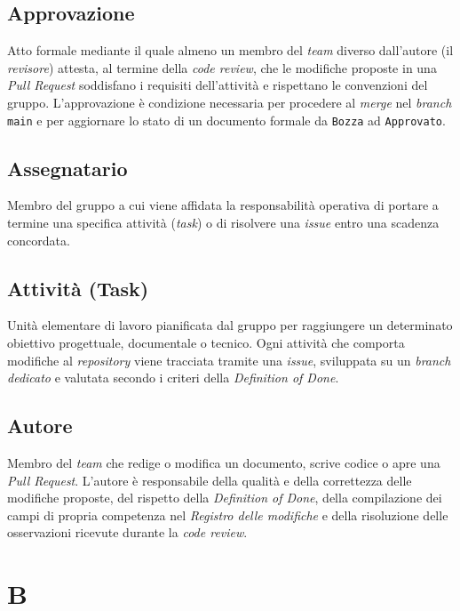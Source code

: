 \documentclass[11pt, a4paper]{article}
\begin{document}
\subsection*{Approvazione}
Atto formale mediante il quale almeno un membro del \textit{team} diverso dall'autore (il \textit{revisore}) attesta, al termine della \textit{code review}, che le modifiche proposte in una \textit{Pull Request} soddisfano i requisiti dell'attività e rispettano le convenzioni del gruppo. L'approvazione è condizione necessaria per procedere al \textit{merge} nel \textit{branch} \texttt{main} e per aggiornare lo stato di un documento formale da \texttt{Bozza} ad \texttt{Approvato}.

\subsection*{Assegnatario}
Membro del gruppo a cui viene affidata la responsabilità operativa di portare a termine una specifica attività (\textit{task}) o di risolvere una \textit{issue} entro una scadenza concordata.

\subsection*{Attività (Task)}
Unità elementare di lavoro pianificata dal gruppo per raggiungere un determinato obiettivo progettuale, documentale o tecnico. Ogni attività che comporta modifiche al \textit{repository} viene tracciata tramite una \textit{issue}, sviluppata su un \textit{branch dedicato} e valutata secondo i criteri della \textit{Definition of Done}.

\subsection*{Autore}
Membro del \textit{team} che redige o modifica un documento, scrive codice o apre una \textit{Pull Request}. L'autore è responsabile della qualità e della correttezza delle modifiche proposte, del rispetto della \textit{Definition of Done}, della compilazione dei campi di propria competenza nel \textit{Registro delle modifiche} e della risoluzione delle osservazioni ricevute durante la \textit{code review}.

\newpage

\section*{B}
\end{document}
